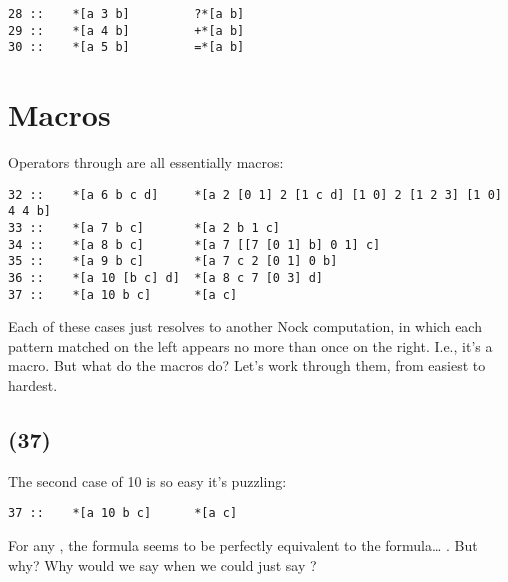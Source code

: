 \begin{framed_shaded}
\begin{Verbatim}[fontsize=\relsize{-2.5},fontseries=b,commandchars=\\\{\}]
28 ::    *[a 3 b]         ?*[a b]
29 ::    *[a 4 b]         +*[a b]
30 ::    *[a 5 b]         =*[a b]
\end{Verbatim}
\end{framed_shaded}

\section{Macros}

Operators  through  are all essentially macros:

\begin{framed_shaded}
\begin{Verbatim}[fontsize=\relsize{-2.5},fontseries=b,commandchars=\\\{\}]
32 ::    *[a 6 b c d]     *[a 2 [0 1] 2 [1 c d] [1 0] 2 [1 2 3] [1 0] 4 4 b]
33 ::    *[a 7 b c]       *[a 2 b 1 c]
34 ::    *[a 8 b c]       *[a 7 [[7 [0 1] b] 0 1] c]
35 ::    *[a 9 b c]       *[a 7 c 2 [0 1] 0 b]
36 ::    *[a 10 [b c] d]  *[a 8 c 7 [0 3] d]
37 ::    *[a 10 b c]      *[a c]
\end{Verbatim}
\end{framed_shaded}

Each of these cases just resolves to another Nock computation, in
which each pattern matched on the left appears no more than once
on the right.  I.e., it's a macro.  But what do the macros do?
Let's work through them, from easiest to hardest.

\subsection{ (37)}

The second case of 10 is so easy it's puzzling:

\begin{framed_shaded}
\begin{Verbatim}[fontsize=\relsize{-2.5},fontseries=b,commandchars=\\\{\}]
37 ::    *[a 10 b c]      *[a c]
\end{Verbatim}
\end{framed_shaded}

For any , the formula \kode{[10 b c]} seems to be perfectly
equivalent to the formula\ldots{} .  But why?  Why would we say
\kode{[10 b c]} when we could just say ?

